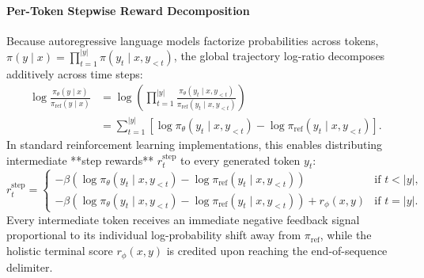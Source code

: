 \documentclass[../../../main.tex]{subfiles}
\begin{document}
\paragraph{Per-Token Stepwise Reward Decomposition}
Because autoregressive language models factorize probabilities across tokens, $\pi(y \mid x) = \prod_{t=1}^{|y|} \pi(y_t \mid x, y_{<t})$, the global trajectory log-ratio decomposes additively across time steps:
\begin{align}
\log \frac{\pi_\theta(y \mid x)}{\pi_{\text{ref}}(y \mid x)} &= \log \left( \prod_{t=1}^{|y|} \frac{\pi_\theta(y_t \mid x, y_{<t})}{\pi_{\text{ref}}(y_t \mid x, y_{<t})} \right) \nonumber \\
&= \sum_{t=1}^{|y|} \left[ \log \pi_\theta(y_t \mid x, y_{<t}) - \log \pi_{\text{ref}}(y_t \mid x, y_{<t}) \right].
\end{align}
In standard reinforcement learning implementations, this enables distributing intermediate **step rewards** $r_t^{\text{step}}$ to every generated token $y_t$:
\begin{equation}
\label{eq:step_reward_formulation}
r_t^{\text{step}} = \begin{cases}
-\beta \left( \log \pi_\theta(y_t \mid x, y_{<t}) - \log \pi_{\text{ref}}(y_t \mid x, y_{<t}) \right) & \text{if } t < |y|, \\
-\beta \left( \log \pi_\theta(y_t \mid x, y_{<t}) - \log \pi_{\text{ref}}(y_t \mid x, y_{<t}) \right) + r_\phi(x, y) & \text{if } t = |y|.
\end{cases}
\end{equation}
Every intermediate token receives an immediate negative feedback signal proportional to its individual log-probability shift away from $\pi_{\text{ref}}$, while the holistic terminal score $r_\phi(x, y)$ is credited upon reaching the end-of-sequence delimiter.
\end{document}
